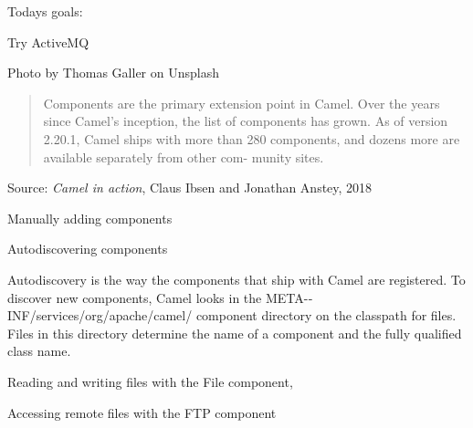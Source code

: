 \documentclass[Screen16to9,17pt]{foils}
\begin{document}
Todays goals:
\begin{list2}
\item
\item
\item
\item Try ActiveMQ
\end{list2}

Photo by Thomas Galler on Unsplash



\begin{quote}
Components are the primary extension point in Camel. Over the years since Camel’s
inception, the list of components has grown. As of version 2.20.1, Camel ships with
more than 280 components, and dozens more are available separately from other com-
munity sites.
\end{quote}
Source: \emph{Camel in action}, Claus Ibsen and Jonathan Anstey, 2018






\begin{list2}
\item Manually adding components
\item Autodiscovering components
\end{list2}



Autodiscovery is the way the components that ship with Camel are registered. To discover new components, Camel looks in the META-­INF/services/org/apache/camel/
component directory on the classpath for files. Files in this directory determine the
name of a component and the fully qualified class name.




\begin{list2}
\item Reading and writing files with the File component,
\item Accessing remote files with the FTP component
\end{list2}
\end{document}
